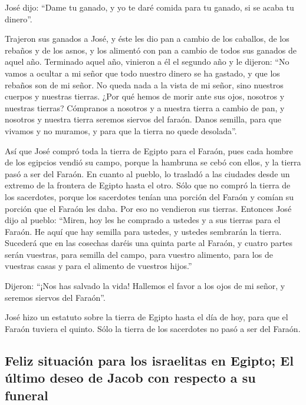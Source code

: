  José dijo: ``Dame tu ganado, y yo te daré comida para tu
ganado, si se acaba tu dinero''.

 Trajeron sus ganados a José, y éste les dio pan a cambio
de los caballos, de los rebaños y de los asnos, y los alimentó con pan a
cambio de todos sus ganados de aquel año.  Terminado
aquel año, vinieron a él el segundo año y le dijeron: ``No vamos a
ocultar a mi señor que todo nuestro dinero se ha gastado, y que los
rebaños son de mi señor. No queda nada a la vista de mi señor, sino
nuestros cuerpos y nuestras tierras.  ¿Por qué hemos de
morir ante sus ojos, nosotros y nuestras tierras? Cómpranos a nosotros y
a nuestra tierra a cambio de pan, y nosotros y nuestra tierra seremos
siervos del faraón. Danos semilla, para que vivamos y no muramos, y para
que la tierra no quede desolada''.

 Así que José compró toda la tierra de Egipto para el
Faraón, pues cada hombre de los egipcios vendió su campo, porque la
hambruna se cebó con ellos, y la tierra pasó a ser del Faraón.
 En cuanto al pueblo, lo trasladó a las ciudades desde un
extremo de la frontera de Egipto hasta el otro.  Sólo que
no compró la tierra de los sacerdotes, porque los sacerdotes tenían una
porción del Faraón y comían su porción que el Faraón les daba. Por eso
no vendieron sus tierras.  Entonces José dijo al pueblo:
``Miren, hoy les he comprado a ustedes y a sus tierras para el Faraón.
He aquí que hay semilla para ustedes, y ustedes sembrarán la tierra.
 Sucederá que en las cosechas daréis una quinta parte al
Faraón, y cuatro partes serán vuestras, para semilla del campo, para
vuestro alimento, para los de vuestras casas y para el alimento de
vuestros hijos.''

 Dijeron: ``¡Nos has salvado la vida! Hallemos el favor a
los ojos de mi señor, y seremos siervos del Faraón''.

 José hizo un estatuto sobre la tierra de Egipto hasta el
día de hoy, para que el Faraón tuviera el quinto. Sólo la tierra de los
sacerdotes no pasó a ser del Faraón.

\hypertarget{feliz-situaciuxf3n-para-los-israelitas-en-egipto-el-uxfaltimo-deseo-de-jacob-con-respecto-a-su-funeral}{%
\subsection{Feliz situación para los israelitas en Egipto; El último
deseo de Jacob con respecto a su
funeral}\label{feliz-situaciuxf3n-para-los-israelitas-en-egipto-el-uxfaltimo-deseo-de-jacob-con-respecto-a-su-funeral}}

